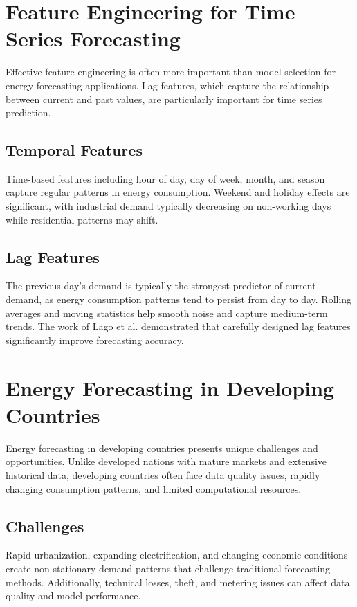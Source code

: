     \section{Feature Engineering for Time Series Forecasting}
        Effective feature engineering is often more important than model selection for energy forecasting applications. Lag features, which capture the relationship between current and past values, are particularly important for time series prediction.

        \subsection{Temporal Features}
        Time-based features including hour of day, day of week, month, and season capture regular patterns in energy consumption. Weekend and holiday effects are significant, with industrial demand typically decreasing on non-working days while residential patterns may shift.

        \subsection{Lag Features}
        The previous day's demand is typically the strongest predictor of current demand, as energy consumption patterns tend to persist from day to day. Rolling averages and moving statistics help smooth noise and capture medium-term trends. The work of Lago et al. \cite{lago2018modeling} demonstrated that carefully designed lag features significantly improve forecasting accuracy.

    \section{Energy Forecasting in Developing Countries}
        Energy forecasting in developing countries presents unique challenges and opportunities. Unlike developed nations with mature markets and extensive historical data, developing countries often face data quality issues, rapidly changing consumption patterns, and limited computational resources.

        \subsection{Challenges}
        Rapid urbanization, expanding electrification, and changing economic conditions create non-stationary demand patterns that challenge traditional forecasting methods. Additionally, technical losses, theft, and metering issues can affect data quality and model performance.

